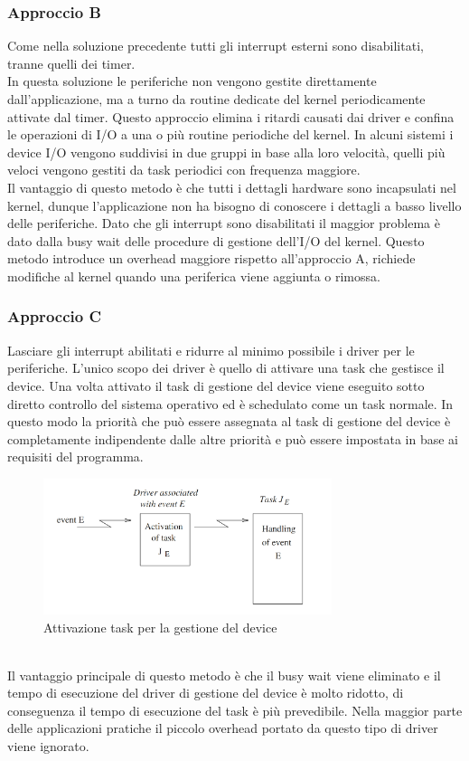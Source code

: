 \documentclass[12pt,openany,onesided]{book}
\begin{document}
\subsubsection{Approccio B}
Come nella soluzione precedente tutti gli interrupt esterni sono disabilitati,
tranne quelli dei timer.\\
In questa soluzione le periferiche non vengono gestite direttamente dall'applicazione, ma a turno da routine dedicate del kernel 
periodicamente attivate dal timer.
Questo approccio elimina i ritardi causati dai driver e confina le operazioni di I/O a una o più routine periodiche del kernel.
In alcuni sistemi i device I/O vengono suddivisi in due gruppi in base alla loro velocità, quelli più veloci vengono gestiti da task 
periodici con frequenza maggiore.
\\
Il vantaggio di questo metodo è che tutti i dettagli hardware sono incapsulati nel kernel, dunque l'applicazione non ha bisogno di 
conoscere i dettagli a basso livello delle periferiche.
Dato che gli interrupt sono disabilitati il maggior problema è dato dalla busy wait delle procedure di gestione dell'I/O del kernel.
Questo metodo introduce un overhead maggiore rispetto all'approccio A, richiede modifiche al kernel quando una periferica viene aggiunta o rimossa.
\subsubsection{Approccio C}
Lasciare gli interrupt abilitati e ridurre al minimo possibile i driver per le periferiche.
L'unico scopo dei driver è quello di attivare una task che gestisce il device. Una volta attivato il task di gestione del device 
viene eseguito sotto diretto controllo del sistema operativo
ed è schedulato come un task normale.
In questo modo la priorità che può essere assegnata al task di gestione del device è completamente indipendente dalle altre priorità 
e può essere impostata in base ai requisiti del programma.
\begin{figure}[H]
\centering
\includegraphics[height=150px]{pictures/approccioC.png}
\caption{Attivazione task per la gestione del device}
\end{figure}
\\
Il vantaggio principale di questo metodo è che il busy wait viene eliminato e il tempo di esecuzione del driver di gestione del device è 
molto ridotto, di conseguenza il tempo di esecuzione del task è più prevedibile.
Nella maggior parte delle applicazioni pratiche il piccolo overhead portato da questo tipo di driver viene ignorato.
\end{document}
